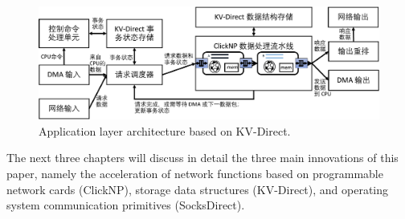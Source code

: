 \begin{figure}[htbp]
	\centering
	\includegraphics[width=1.0\textwidth]{figures/kvdirect_arch.pdf}
	\caption{Application layer architecture based on KV-Direct.}
	\label{arch:fig:kvdirect_arch}
\end{figure}
\fi

The next three chapters will discuss in detail the three main innovations of this paper, namely the acceleration of network functions based on programmable network cards (ClickNP), storage data structures (KV-Direct), and operating system communication primitives (SocksDirect).
